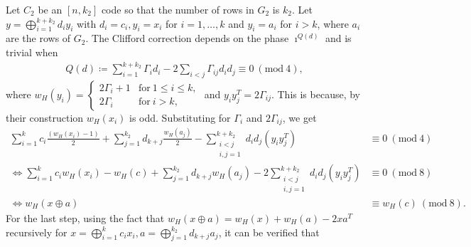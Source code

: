 \documentclass[twoside,romanappendices]{IEEEtran}
\begin{document}
Let $C_2$ be an $[n,k_2]$ code so that the number of rows in $G_2$ is $k_2$.
Let $y = \bigoplus_{i=1}^{k + k_2} d_i y_i$ with $d_i = c_i, y_i = x_i$ for $i = 1,\ldots,k$ and $y_i = a_i$ for $i > k$, where $a_i$ are the rows of $G_2$.
The Clifford correction depends on the phase $\imath^{Q(d)}$ and is trivial when
\begin{align}
Q(d) \coloneqq \sum_{i=1}^{k + k_2} \Gamma_i d_i - 2 \sum_{i < j} \Gamma_{ij} d_i d_j \equiv 0\ (\text{mod}\ 4),
\end{align}
where $w_H(y_i) = 
\begin{cases}
2 \Gamma_i + 1 & \text{for}\ 1 \leq i \leq k, \\
2 \Gamma_i & \text{for}\ i > k,
\end{cases}$
and $y_i y_j^T = 2 \Gamma_{ij}$.
This is because, by their construction $w_H(x_i)$ is odd.
Substituting for $\Gamma_i$ and $2 \Gamma_{ij}$, we get
\begin{align}
\sum_{i=1}^{k} c_i \frac{(w_H(x_i) - 1)}{2} + \sum_{j=1}^{k_2} d_{k+j} \frac{w_H(a_j)}{2} - \sum_{\substack{i < j\\i,j = 1}}^{k+k_2} d_i d_j (y_i y_j^T) & \equiv 0\ (\text{mod}\ 4) \\
%
\Leftrightarrow \sum_{i=1}^{k} c_i w_H(x_i) - w_H(c) + \sum_{j = 1}^{k_2} d_{k+j} w_H(a_j) - 2 \sum_{\substack{i < j\\i,j = 1}}^{k+k_2} d_i d_j (y_i y_j^T) & \equiv 0\ (\text{mod}\ 8) \\
%
%
\Leftrightarrow w_H(x \oplus a) & \equiv w_H(c)\ (\text{mod}\ 8).
\end{align}
For the last step, using the fact that $w_H(x \oplus a) = w_H(x) + w_H(a) - 2 xa^T$ recursively for $x = \bigoplus_{i=1}^{k} c_i x_i, a = \bigoplus_{j=1}^{k_2} d_{k+j} a_j$, it can be verified that 
\end{document}
